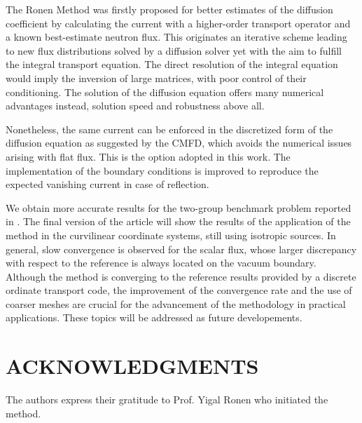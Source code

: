 \documentclass{ictt26}
\begin{document}
The Ronen Method was firstly proposed for better estimates of the diffusion coefficient by calculating the current with a higher-order transport operator and a known best-estimate neutron flux. This originates an iterative scheme leading to new flux distributions solved by a diffusion solver yet with the aim to fulfill the integral transport equation. The direct resolution of the integral equation would imply the inversion of large matrices, with poor control of their conditioning. The solution of the diffusion equation offers many numerical advantages instead, solution speed and robustness above all.

Nonetheless, the same current can be enforced in the discretized form of the diffusion equation as suggested by the CMFD, which avoids the numerical issues arising with flat flux. This is the option adopted in this work. The implementation of the boundary conditions is improved to reproduce the expected vanishing current in case of reflection.

We obtain more accurate results for the two-group benchmark problem reported in \cite{tomatis2011application}. The final version of the article will show the results of the application of the method in the curvilinear coordinate systems, still using isotropic sources. In general, slow convergence is observed for the scalar flux, whose larger discrepancy with respect to the reference is always located on the vacuum boundary. Although the method is converging to the reference results provided by a discrete ordinate transport code, the improvement of the convergence rate and the use of coarser meshes are crucial for the advancement of the methodology in practical applications. These topics will be addressed as future developements.


\section*{ACKNOWLEDGMENTS}

The authors express their gratitude to Prof. Yigal Ronen who initiated the method.

\setlength{\baselineskip}{12pt}


\end{document}
